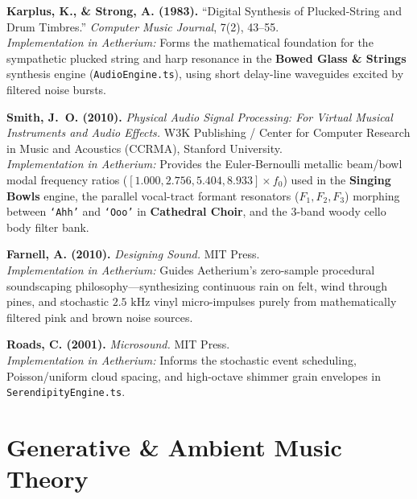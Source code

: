 \documentclass[11pt,oneside,openany]{book}
\begin{document}
\begin{enumerate}[label=\textbf{[\arabic*]}]
  \item \textbf{Karplus, K., \& Strong, A. (1983).} ``Digital Synthesis of Plucked-String and Drum Timbres.'' \textit{Computer Music Journal}, 7(2), 43--55.\\
  \textit{Implementation in Aetherium:} Forms the mathematical foundation for the sympathetic plucked string and harp resonance in the \textbf{Bowed Glass \& Strings} synthesis engine (\texttt{AudioEngine.ts}), using short delay-line waveguides excited by filtered noise bursts.

  \item \textbf{Smith, J.\ O. (2010).} \textit{Physical Audio Signal Processing: For Virtual Musical Instruments and Audio Effects.} W3K Publishing / Center for Computer Research in Music and Acoustics (CCRMA), Stanford University.\\
  \textit{Implementation in Aetherium:} Provides the Euler-Bernoulli metallic beam/bowl modal frequency ratios ($[1.000, 2.756, 5.404, 8.933] \times f_0$) used in the \textbf{Singing Bowls} engine, the parallel vocal-tract formant resonators ($F_1, F_2, F_3$) morphing between \texttt{`Ahh'} and \texttt{`Ooo'} in \textbf{Cathedral Choir}, and the 3-band woody cello body filter bank.

  \item \textbf{Farnell, A. (2010).} \textit{Designing Sound.} MIT Press.\\
  \textit{Implementation in Aetherium:} Guides Aetherium's zero-sample procedural soundscaping philosophy---synthesizing continuous rain on felt, wind through pines, and stochastic $2.5\text{ kHz}$ vinyl micro-impulses purely from mathematically filtered pink and brown noise sources.

  \item \textbf{Roads, C. (2001).} \textit{Microsound.} MIT Press.\\
  \textit{Implementation in Aetherium:} Informs the stochastic event scheduling, Poisson/uniform cloud spacing, and high-octave shimmer grain envelopes in \texttt{SerendipityEngine.ts}.
\end{enumerate}

\section{Generative \& Ambient Music Theory}
\end{document}
